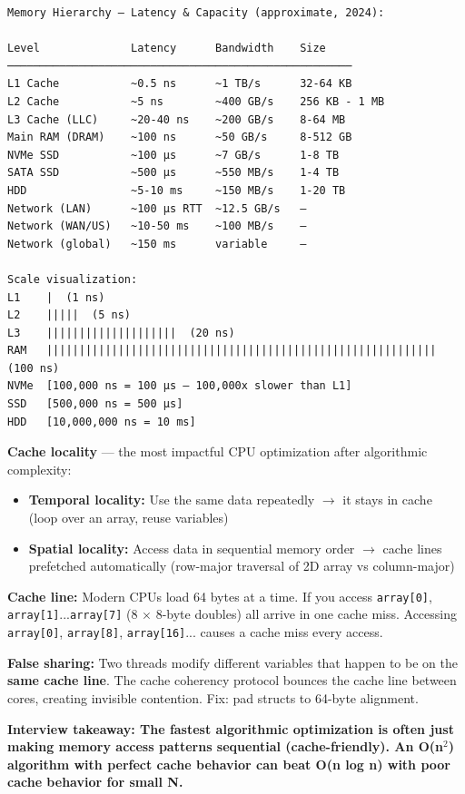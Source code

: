 \documentclass[11pt]{article}
\providecommand{\tightlist}{\setlength{\itemsep}{1pt}\setlength{\parskip}{0pt}}
\begin{document}
\begin{verbatim}
Memory Hierarchy — Latency & Capacity (approximate, 2024):

Level              Latency      Bandwidth    Size
─────────────────────────────────────────────────────
L1 Cache           ~0.5 ns      ~1 TB/s      32-64 KB
L2 Cache           ~5 ns        ~400 GB/s    256 KB - 1 MB
L3 Cache (LLC)     ~20-40 ns    ~200 GB/s    8-64 MB
Main RAM (DRAM)    ~100 ns      ~50 GB/s     8-512 GB
NVMe SSD           ~100 µs      ~7 GB/s      1-8 TB
SATA SSD           ~500 µs      ~550 MB/s    1-4 TB
HDD                ~5-10 ms     ~150 MB/s    1-20 TB
Network (LAN)      ~100 µs RTT  ~12.5 GB/s   —
Network (WAN/US)   ~10-50 ms    ~100 MB/s    —
Network (global)   ~150 ms      variable     —

Scale visualization:
L1    |  (1 ns)
L2    |||||  (5 ns)
L3    ||||||||||||||||||||  (20 ns)
RAM   ||||||||||||||||||||||||||||||||||||||||||||||||||||||||||||  (100 ns)
NVMe  [100,000 ns = 100 µs — 100,000x slower than L1]
SSD   [500,000 ns = 500 µs]
HDD   [10,000,000 ns = 10 ms]
\end{verbatim}

\textbf{Cache locality} --- the most impactful CPU optimization after algorithmic complexity:

\begin{itemize}
\tightlist
\item
  \textbf{Temporal locality:} Use the same data repeatedly \(\rightarrow\) it stays in cache (loop over an array, reuse variables)
\item
  \textbf{Spatial locality:} Access data in sequential memory order \(\rightarrow\) cache lines prefetched automatically (row-major traversal of 2D array vs column-major)
\end{itemize}

\textbf{Cache line:} Modern CPUs load 64 bytes at a time. If you access \texttt{array{[}0{]}}, \texttt{array{[}1{]}}...\texttt{array{[}7{]}} (8 \(\times\) 8-byte doubles) all arrive in one cache miss. Accessing \texttt{array{[}0{]}}, \texttt{array{[}8{]}}, \texttt{array{[}16{]}}... causes a cache miss every access.

\textbf{False sharing:} Two threads modify different variables that happen to be on the \textbf{same cache line}. The cache coherency protocol bounces the cache line between cores, creating invisible contention. Fix: pad structs to 64-byte alignment.

\textbf{Interview takeaway: The fastest algorithmic optimization is often just making memory access patterns sequential (cache-friendly). An O(n\(^2\)) algorithm with perfect cache behavior can beat O(n log n) with poor cache behavior for small N.}
\end{document}
